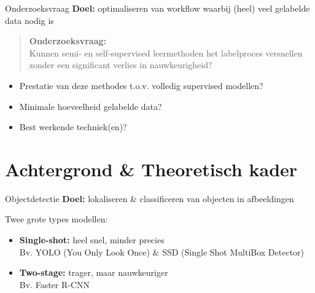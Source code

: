 \documentclass[aspectratio=169]{beamer}
\begin{document}
    \begin{frame}{Onderzoeksvraag}
        \textbf{Doel:} optimaliseren van workflow waarbij (heel) veel gelabelde data nodig is
        
        \vspace{\baselineskip}
        
        \begin{quote}
            \textbf{Onderzoeksvraag:} \\
            Kunnen semi- en self-supervised leermethoden het labelproces versnellen zonder een significant verlies in nauwkeurigheid?
        \end{quote}
        
        \begin{itemize}
            \item Prestatie van deze methodes t.o.v. volledig supervised modellen?
            \item Minimale hoeveelheid gelabelde data?
            \item Best werkende techniek(en)?
        \end{itemize}
    \end{frame}
    
    \section{Achtergrond \& Theoretisch kader}
    
    \begin{frame}{Objectdetectie}
        \textbf{Doel:} lokaliseren \& classificeren van objecten in afbeeldingen
        
        \vspace{\baselineskip}
        
        Twee grote types modellen:
        
        \begin{itemize}
            \item \textbf{Single-shot:} heel snel, minder precies \\ Bv. YOLO (You Only Look Once) \& SSD (Single Shot MultiBox Detector)
            \item \textbf{Two-stage:} trager, maar nauwkeuriger \\ Bv. Faster R-CNN
        \end{itemize}
    \end{frame}
    
\end{document}

